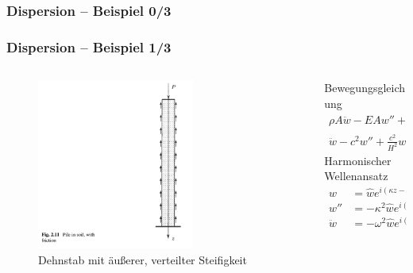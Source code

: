 \documentclass[hyperref={pdfpagemode=FullScreen, colorlinks=false}]{beamer}
\begin{document}
\begin{frame}
\frametitle{Dispersion -- Beispiel 0/3} 

\end{frame}


\begin{frame}
\frametitle{Dispersion -- Beispiel 1/3} 
\begin{columns}
\begin{column}[t]{.6\linewidth}
\begin{figure}
\includegraphics[width=0.65\textwidth]{fig_pdf/wavebar_friction}
\caption*{Dehnstab mit äußerer, verteilter Steifigkeit \cite{Verruijt2010}}
\end{figure}   
\end{column}
\begin{column}[t]{.4\linewidth}
Bewegungsgleichung
   \begin{align*}
    \rho A \ddot{w}-EAw''+\frac{EA}{H^2}w &= 0 \\
    \ddot{w}-c^2w''+\frac{c^2}{H^2}w &= 0
   \end{align*}
   Harmonischer Wellenansatz
   \begin{align*}
    w&=\hat{w}e^{i(\kappa z-\omega t)}\\
    w''&=-\kappa^2 \hat{w}e^{i(\kappa z-\omega t)}\\
    \ddot{w}&=-\omega^2 \hat{w}e^{i(\kappa z-\omega t)}
   \end{align*}
  \end{column}
\end{columns}
\end{frame}
\end{document}
